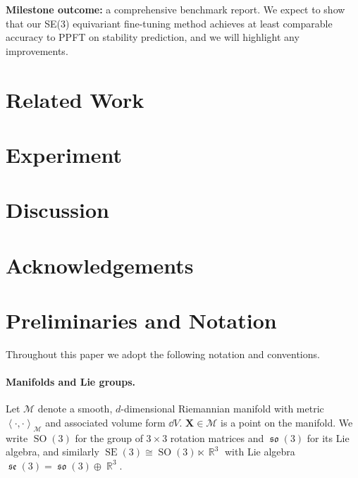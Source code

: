 \documentclass{article}
\theoremstyle{plain}
\theoremstyle{definition}
\theoremstyle{remark}
\DeclareMathOperator{\SE}{SE}
\DeclareMathOperator{\SO}{SO}
\DeclareMathOperator{\se}{\mathfrak{se}}
\DeclareMathOperator{\so}{\mathfrak{so}}
\DeclareMathOperator{\R}{\mathbb{R}}
\newcommand{\inner}[2]{\left\langle #1, #2\right\rangle}
\begin{document}
{\bf Milestone outcome:} a comprehensive benchmark report. We expect to show that our SE(3) equivariant fine-tuning method achieves at least comparable accuracy to PPFT on stability prediction, and we will highlight any improvements.

\section{Related Work}

\section{Experiment}

\section{Discussion}

\section*{Acknowledgements}






\newpage
\appendix
\onecolumn

\section{Preliminaries and Notation}

Throughout this paper we adopt the following notation and conventions.

\paragraph{Manifolds and Lie groups.}
Let $\mathcal{M}$ denote a smooth, $d$-dimensional Riemannian manifold with metric $\inner{\cdot}{\cdot}_{\mathcal{M}}$ and associated volume form $\dd V$. $\mathbf{X} \in \mathcal{M}$ is a point on the manifold. We write $\SO(3)$ for the group of $3\times3$ rotation matrices and $\so(3)$ for its Lie algebra, and similarly $\SE(3)\cong\SO(3)\ltimes\R^3$ with Lie algebra $\se(3)=\so(3)\oplus\R^3$.
\end{document}
